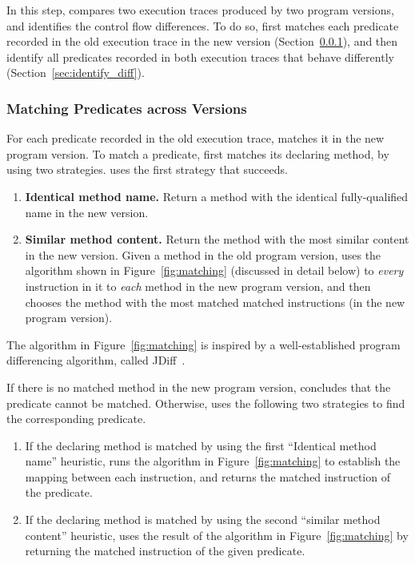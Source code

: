 

In this step, \ourtool compares two execution traces
produced by two program versions, and identifies the
control flow differences. To do so, \ourtool
first matches each predicate recorded in the old
execution trace in the new version (Section~\ref{sec:match_predicate}),
and then identify all predicates recorded in both execution traces that
behave differently (Section~\ref{sec:identify_diff}).


\subsubsection{Matching Predicates across Versions}
\label{sec:match_predicate}

For each predicate recorded in the old execution trace,
\ourtool matches it in the new program version.
To match a predicate, \ourtool first matches its declaring method,
by using two strategies. \ourtool uses
the first strategy that succeeds.



\begin{enumerate}
\item \textbf{Identical method name.} Return a method with the identical
fully-qualified name in the new version.
\item \textbf{Similar method content.} Return the method with
the most similar content in the new version. Given
a method in the old program version, \ourtool
uses the algorithm shown in Figure~\ref{fig:matching} (discussed
in detail below) to \textit{every} instruction in it to
\textit{each} method in the new program version, and then
chooses the method with the most matched matched instructions
(in the new program version).
\end{enumerate}

The algorithm in Figure~\ref{fig:matching} is inspired by
a well-established program differencing algorithm, called
JDiff~\cite{}. 

If there is no matched method in the new program
version, \ourtool concludes that the predicate cannot be
matched. Otherwise, \ourtool uses the following two strategies
to find the corresponding predicate.

\begin{enumerate}
\item If the declaring method is matched by using the first
``Identical method name'' heuristic, \ourtool runs the algorithm
in Figure~\ref{fig:matching} to establish the mapping between
each instruction, and returns the matched instruction of the
predicate.
\item If the declaring method is matched by using the second
``similar method content'' heuristic,  \ourtool
uses the result of the algorithm in Figure~\ref{fig:matching}
by returning the matched instruction of the given predicate.
\end{enumerate}

